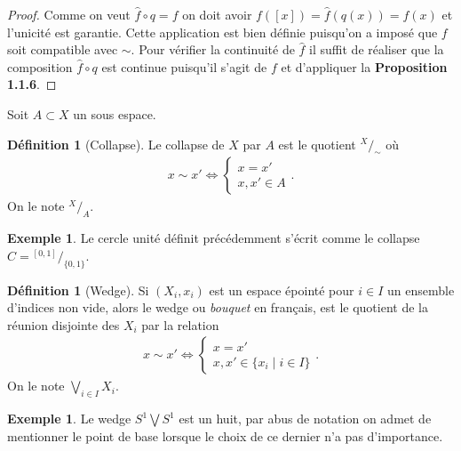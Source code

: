 \documentclass[12pt]{book}
\theoremstyle{definition}
\newtheorem{definition}[lemma]{Définition}
\newtheorem{example}[lemma]{Exemple}
\theoremstyle{remark}
\newcommand*\quot[2]{{^{\textstyle #1}\big/_{\textstyle #2}}}
\begin{document}
	\begin{proof}
		Comme on veut $\hat{f}\circ q = f$ on doit avoir $f([x]) = \hat{f}(q(x)) = f(x)$ et l'unicité est garantie. Cette application est bien définie puisqu'on a imposé que $f$ soit compatible avec $\sim$. Pour vérifier la continuité de $\hat{f}$ il suffit de réaliser que la composition $\hat{f} \circ q$ est continue puisqu'il s'agit de $f$ et d'appliquer la \textbf{Proposition 1.1.6}. 

	\end{proof}
	Soit $A\subset X$ un sous espace.
	\begin{definition}[Collapse]
		Le collapse de $X$ par $A$ est le quotient $\quot{X}{\sim}$ où
		 \begin{align*}
			x \sim x' \iff \begin{cases}
				x=x' \\
				x,x' \in A
			\end{cases}
		.\end{align*}
		On le note $\quot{X}{A}$.
	\end{definition}
	\begin{example}
		Le cercle unité définit précédemment s'écrit comme le collapse $C = \quot{[0,1]}{\{0,1\}}$.
	\end{example}

	\begin{definition}[Wedge]
		Si $(X_i,x_i)$ est un espace épointé pour $i\in I$ un ensemble d'indices non vide, alors le wedge ou \emph{bouquet} en français, est le quotient de la réunion disjointe des $X_i$ par la relation
		 \begin{align*}
			x\sim x' \iff \begin{cases}
				x=x' \\
				x,x' \in \{x_i \;|\; i\in I\} 
			\end{cases}
		.\end{align*} On le note $\bigvee_{i\in I} X_i$.
	\end{definition}
	\begin{example}
		Le wedge $S^1 \bigvee S^1$ est un huit, par abus de notation on admet de mentionner le point de base lorsque le choix de ce dernier n'a pas d'importance.
	\end{example}
\end{document}
